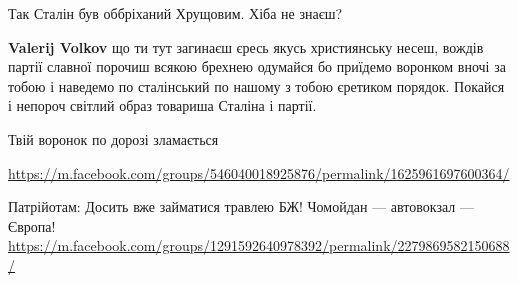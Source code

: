 \begin{itemize}
\begin{itemize}
 
Так Сталін був оббріханий Хрущовим.
Хіба не знаєш?

 
\textbf{Valerij Volkov} що ти тут загинаєш єресь якусь християнську несеш, вождів партії славної порочиш всякою брехнею одумайся бо приїдемо воронком вночі за тобою і наведемо по сталінський по нашому з тобою єретиком порядок. Покайся і непороч світлий образ товариша Сталіна і партії.

 
Твій воронок по дорозі зламається
\end{itemize}

 
\url{https://m.facebook.com/groups/546040018925876/permalink/1625961697600364/}

 
Патрійотам:
Досить вже займатися травлею БЖ!
Чомойдан — автовокзал — Європа!
\url{https://m.facebook.com/groups/1291592640978392/permalink/2279869582150688/}

\begin{itemize}
 

\end{itemize}
\end{itemize}
